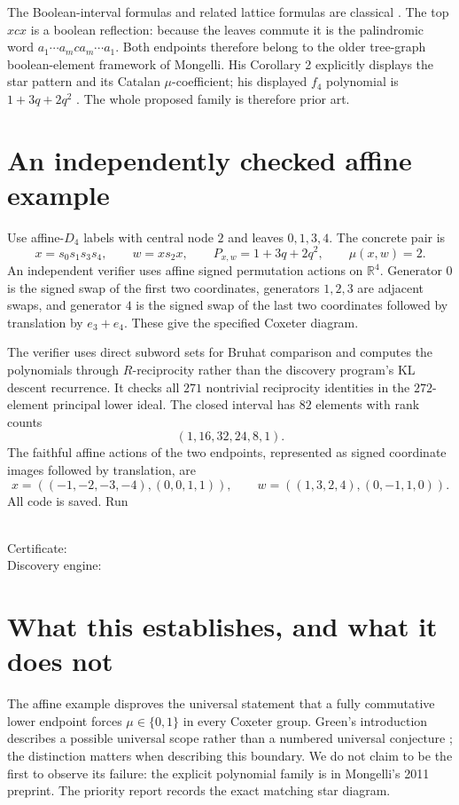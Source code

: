 \documentclass[11pt]{article}
\begin{document}
The Boolean-interval formulas and related lattice formulas are classical
\cite{Brenti}. The top $xcx$ is a boolean reflection: because the leaves
commute it is the palindromic word $a_1\cdots a_mca_m\cdots a_1$.
Both endpoints therefore belong to the older tree-graph boolean-element
framework of Mongelli. His Corollary 2 explicitly displays the star pattern
and its Catalan $\mu$-coefficient; his displayed $f_4$ polynomial is
$1+3q+2q^2$ \cite[preprint pp.6 and 10]{Mongelli}.
The whole proposed family is therefore prior art.

\section{An independently checked affine example}
Use affine-$D_4$ labels with central node $2$ and leaves $0,1,3,4$.
The concrete pair is
\[
 x=s_0s_1s_3s_4,\qquad w=xs_2x,
 \qquad P_{x,w}=1+3q+2q^2,\qquad\mu(x,w)=2.
\]
An independent verifier uses affine signed permutation actions on
$\mathbb R^4$. Generator $0$ is the signed swap of the first two
coordinates, generators $1,2,3$ are adjacent swaps, and generator $4$
is the signed swap of the last two coordinates followed by translation
by $e_3+e_4$. These give the specified Coxeter diagram.

The verifier uses direct subword sets for Bruhat comparison and computes
the polynomials through $R$-reciprocity rather than the discovery program's
KL descent recurrence. It checks all $271$ nontrivial reciprocity identities
in the $272$-element principal lower ideal. The closed interval has $82$
elements with rank counts
\[
 (1,16,32,24,8,1).
\]
The faithful affine actions of the two endpoints, represented as signed
coordinate images followed by translation, are
\[
 x=((-1,-2,-3,-4),(0,0,1,1)),\qquad
 w=((1,3,2,4),(0,-1,1,0)).
\]
All code is saved. Run
\begin{flushleft}\small
{}\\
Certificate: \\
Discovery engine: 
\end{flushleft}

\section{What this establishes, and what it does not}
The affine example disproves the universal statement that a fully
commutative lower endpoint forces $\mu\in\{0,1\}$ in every Coxeter group.
Green's introduction describes a possible universal scope rather than a
numbered universal conjecture \cite[printed pp.2--3]{Green}; the distinction
matters when describing this boundary. We do not claim to be the first to
observe its failure: the explicit polynomial family is in Mongelli's 2011
preprint. The priority report records the exact matching star diagram.
\end{document}
